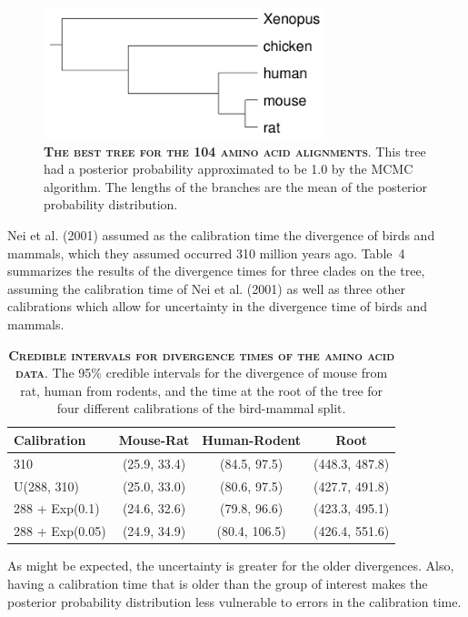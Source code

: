 \documentclass{svmult}
\begin{document}
\begin{figure}[b]
\centering
\includegraphics[height=1.5in]{fig12}
\caption{\textbf{\textsc{The best tree for the 104 amino acid alignments}}.
This tree had a posterior probability approximated to be 1.0 by the MCMC algorithm. The lengths of
the branches are the mean of the posterior probability distribution.}
\label{fig12}
\end{figure}
Nei et al. (2001) assumed as the calibration time the divergence of birds and mammals, which they
assumed occurred 310 million years ago. Table~4 summarizes the results of the divergence times for
three clades on the tree, assuming the calibration time of Nei et al. (2001) as well as three other
calibrations which allow for uncertainty in the divergence time of birds and mammals.
\begin{table}[t]
\centering
\caption{\textbf{\textsc{Credible intervals for divergence times of the amino acid data}}.
The 95\% credible intervals for the divergence of mouse from rat, human from rodents, and the time
at the root of the tree for four different calibrations of the bird-mammal split.}
\begin{tabular}{l c c c} \hline
Calibration & Mouse-Rat & Human-Rodent & Root \\ \hline
310 & (25.9, 33.4) & (84.5, 97.5) & (448.3, 487.8) \\
U(288, 310) & (25.0, 33.0) & (80.6, 97.5) & (427.7, 491.8) \\
288 + Exp(0.1) & (24.6, 32.6) & (79.8, 96.6) & (423.3, 495.1) \\
288 + Exp(0.05) & (24.9, 34.9) & (80.4, 106.5) & (426.4, 551.6) \\ 

\hline
\end{tabular}
\label{tab4}
\end{table}
As might be expected, the uncertainty is greater for the older divergences. Also, having a
calibration time that is older than the group of interest makes the posterior probability
distribution less vulnerable to errors in the calibration time.
\end{document}
